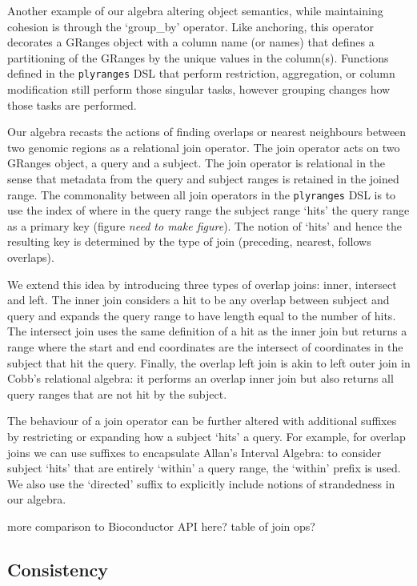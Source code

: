 \documentclass[10pt,letterpaper]{article}
\begin{document}
Another example of our algebra altering object semantics, while
maintaining cohesion is through the `group\_by' operator. Like
anchoring, this operator decorates a GRanges object with a column name
(or names) that defines a partitioning of the GRanges by the unique
values in the column(s). Functions defined in the \texttt{plyranges} DSL
that perform restriction, aggregation, or column modification still
perform those singular tasks, however grouping changes how those tasks
are performed.

Our algebra recasts the actions of finding overlaps or nearest
neighbours between two genomic regions as a relational join operator.
The join operator acts on two GRanges object, a query and a subject. The
join operator is relational in the sense that metadata from the query
and subject ranges is retained in the joined range. The commonality
between all join operators in the \texttt{plyranges} DSL is to use the
index of where in the query range the subject range `hits' the query
range as a primary key (figure \emph{need to make figure}). The notion
of `hits' and hence the resulting key is determined by the type of join
(preceding, nearest, follows overlaps).

We extend this idea by introducing three types of overlap joins: inner,
intersect and left. The inner join considers a hit to be any overlap
between subject and query and expands the query range to have length
equal to the number of hits. The intersect join uses the same definition
of a hit as the inner join but returns a range where the start and end
coordinates are the intersect of coordinates in the subject that hit the
query. Finally, the overlap left join is akin to left outer join in
Cobb's relational algebra: it performs an overlap inner join but also
returns all query ranges that are not hit by the subject.

The behaviour of a join operator can be further altered with additional
suffixes by restricting or expanding how a subject `hits' a query. For
example, for overlap joins we can use suffixes to encapsulate Allan's
Interval Algebra: to consider subject `hits' that are entirely `within'
a query range, the `within' prefix is used. We also use the `directed'
suffix to explicitly include notions of strandedness in our algebra.

more comparison to Bioconductor API here? table of join ops?

\subsection{Consistency}\label{consistency}
\end{document}

